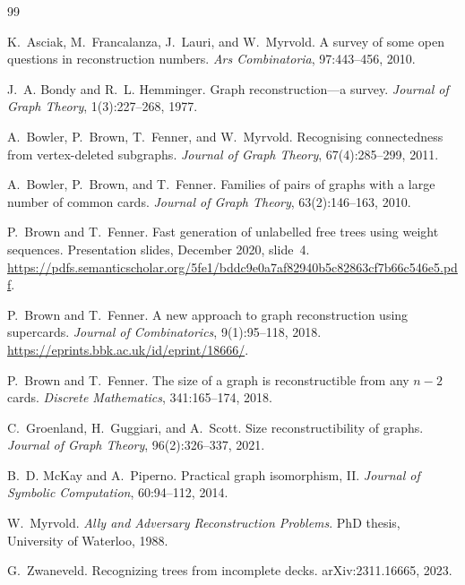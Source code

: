\documentclass[11pt]{article}
\begin{document}
\begin{thebibliography}{99}

K.~Asciak, M.~Francalanza, J.~Lauri, and W.~Myrvold.
\newblock A survey of some open questions in reconstruction numbers.
\newblock \emph{Ars Combinatoria}, 97:443--456, 2010.

J.~A. Bondy and R.~L. Hemminger.
\newblock Graph reconstruction---a survey.
\newblock \emph{Journal of Graph Theory}, 1(3):227--268, 1977.

A.~Bowler, P.~Brown, T.~Fenner, and W.~Myrvold.
\newblock Recognising connectedness from vertex-deleted subgraphs.
\newblock \emph{Journal of Graph Theory}, 67(4):285--299, 2011.

A.~Bowler, P.~Brown, and T.~Fenner.
\newblock Families of pairs of graphs with a large number of common cards.
\newblock \emph{Journal of Graph Theory}, 63(2):146--163, 2010.

P.~Brown and T.~Fenner.
\newblock Fast generation of unlabelled free trees using weight sequences.
\newblock Presentation slides, December 2020, slide~4.
\newblock \url{https://pdfs.semanticscholar.org/5fe1/bddc9e0a7af82940b5c82863cf7b66c546e5.pdf}.

P.~Brown and T.~Fenner.
\newblock A new approach to graph reconstruction using supercards.
\newblock \emph{Journal of Combinatorics}, 9(1):95--118, 2018.
\newblock \url{https://eprints.bbk.ac.uk/id/eprint/18666/}.

P.~Brown and T.~Fenner.
\newblock The size of a graph is reconstructible from any $n-2$ cards.
\newblock \emph{Discrete Mathematics}, 341:165--174, 2018.

C.~Groenland, H.~Guggiari, and A.~Scott.
\newblock Size reconstructibility of graphs.
\newblock \emph{Journal of Graph Theory}, 96(2):326--337, 2021.

B.~D. McKay and A.~Piperno.
\newblock Practical graph isomorphism, II.
\newblock \emph{Journal of Symbolic Computation}, 60:94--112, 2014.

W.~Myrvold.
\newblock \emph{Ally and Adversary Reconstruction Problems}.
\newblock PhD thesis, University of Waterloo, 1988.

G.~Zwaneveld.
\newblock Recognizing trees from incomplete decks.
\newblock arXiv:2311.16665, 2023.

\end{thebibliography}
\end{document}
